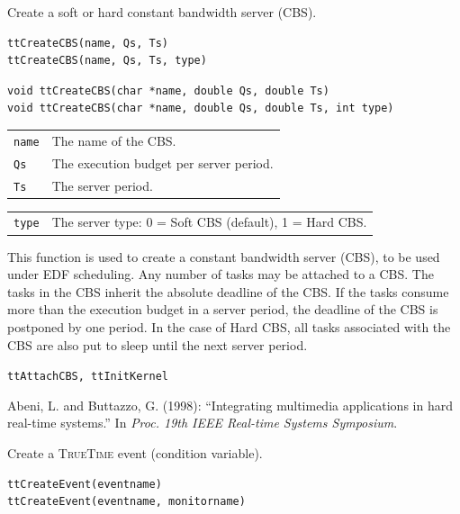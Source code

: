 \documentclass[final,twoside]{rapport}
\begin{document}


\purpose
Create a soft or hard constant bandwidth server (CBS). 

\Msyntax
\begin{verbatim}
ttCreateCBS(name, Qs, Ts)
ttCreateCBS(name, Qs, Ts, type)
\end{verbatim}

\Csyntax
\begin{verbatim}
void ttCreateCBS(char *name, double Qs, double Ts)
void ttCreateCBS(char *name, double Qs, double Ts, int type)
\end{verbatim}

\args
\begin{tabularx}{\hsize}{l>{\raggedright\arraybackslash}X}
  {\tt name} & The name of the CBS. \\
  {\tt Qs} & The execution budget per server period. \\
  {\tt Ts} & The server period. \\
\end{tabularx}

\optargs
\begin{tabularx}{\hsize}{l>{\raggedright\arraybackslash}X}
  {\tt type} & The server type: 0 = Soft CBS (default), 1 = Hard CBS.
\end{tabularx}

\descr This function is used to create a constant bandwidth server
(CBS), to be used under EDF scheduling. Any number of tasks may be
attached to a CBS. The tasks in the CBS inherit the absolute deadline
of the CBS. If the tasks consume more than the execution budget in a
server period, the deadline of the CBS is postponed by one period. In
the case of Hard CBS, all tasks associated with the CBS are also put to
sleep until the next server period.

\seealso
{\tt ttAttachCBS, ttInitKernel}

Abeni, L. and Buttazzo, G. (1998): ``Integrating multimedia
applications in hard real-time systems.'' In {\em Proc. 19th IEEE Real-time Systems Symposium}.



\purpose
Create a \textsc{TrueTime} event (condition variable). 

\Msyntax
\begin{verbatim}
ttCreateEvent(eventname)
ttCreateEvent(eventname, monitorname)
\end{verbatim}
\end{document}
